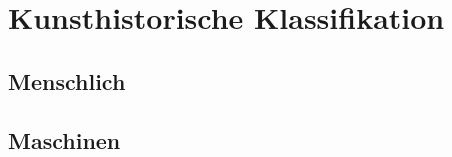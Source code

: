 \chapter{Kunsthistorische Klassifikation}

\blindtext

\section{Menschlich}

\blindtext

\section{Maschinen}

\blindtext
